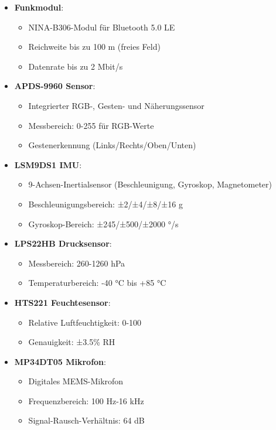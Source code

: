 \begin{itemize}
	\item \textbf{Funkmodul}:
	\begin{itemize}
		\item NINA-B306-Modul für Bluetooth 5.0 LE
		\item Reichweite bis zu 100 m (freies Feld)
		\item Datenrate bis zu 2 Mbit/s
	\end{itemize}
	
	\item \textbf{APDS-9960 Sensor}:
	\begin{itemize}
		\item Integrierter RGB-, Gesten- und Näherungssensor
		\item Messbereich: 0-255 für RGB-Werte
		\item Gestenerkennung (Links/Rechts/Oben/Unten)
	\end{itemize}
	
	\item \textbf{LSM9DS1 IMU}:
	\begin{itemize}
		\item 9-Achsen-Inertialsensor (Beschleunigung, Gyroskop, Magnetometer)
		\item Beschleunigungsbereich: ±2/±4/±8/±16 g
		\item Gyroskop-Bereich: ±245/±500/±2000 °/s
	\end{itemize}
	
	\item \textbf{LPS22HB Drucksensor}:
	\begin{itemize}
		\item Messbereich: 260-1260 hPa
		\item Temperaturbereich: -40 °C bis +85 °C
	\end{itemize} 
	
	\item \textbf{HTS221 Feuchtesensor}:
	\begin{itemize}
		\item Relative Luftfeuchtigkeit: 0-100%
		\item Genauigkeit: ±3.5\% RH
	\end{itemize}
	
	\item \textbf{MP34DT05 Mikrofon}:
	\begin{itemize}
		\item Digitales MEMS-Mikrofon
		\item Frequenzbereich: 100 Hz-16 kHz
		\item Signal-Rausch-Verhältnis: 64 dB
	\end{itemize}
	
\end{itemize}


